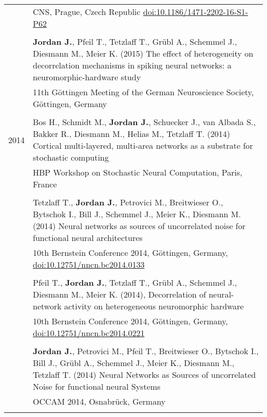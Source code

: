 \begin{longtable}{>{\hfill}p{1.6cm} p{}}
  & \footnotesize CNS, Prague, Czech Republic \href{http://dx.doi.org/10.1186/1471-2202-16-S1-P62}{doi:10.1186/1471-2202-16-S1-P62} \\
 \multicolumn{2}{c}{} \\
  & \textbf{Jordan J.}, Pfeil T., Tetzlaff T., Gr\"ubl A., Schemmel J., Diesmann M., Meier K. (2015) The effect of heterogeneity on decorrelation mechanisms in spiking neural networks: a neuromorphic-hardware study \\
  & \footnotesize 11th G\"ottingen Meeting of the German Neuroscience Society, G\"ottingen, Germany \\
  \multicolumn{2}{c}{} \\
  2014 & Bos H., Schmidt M., \textbf{Jordan J.}, Schuecker J., van Albada S., Bakker R., Diesmann M., Helias M., Tetzlaff T. (2014) Cortical multi-layered, multi-area networks as a substrate for stochastic computing \\
  & \footnotesize HBP Workshop on Stochastic Neural Computation, Paris, France \\
  \multicolumn{2}{c}{} \\
  &  Tetzlaff T., \textbf{Jordan J.}, Petrovici M., Breitwieser O., Bytschok I., Bill J., Schemmel J., Meier K., Diesmann M. (2014) Neural networks as sources of uncorrelated noise for functional neural architectures \\
  & \footnotesize 10th Bernstein Conference 2014, G\"ottingen, Germany, \href{http://dx.doi.org/10.12751/nncn.bc2014.0133}{doi:10.12751/nncn.bc2014.0133} \\
  \multicolumn{2}{c}{} \\
  & Pfeil T., \textbf{Jordan J.}, Tetzlaff T., Gr\"ubl A., Schemmel J., Diesmann M., Meier K. (2014), Decorrelation of neural-network activity on heterogeneous neuromorphic hardware \\
  & \footnotesize 10th Bernstein Conference 2014, G\"ottingen, Germany, \href{http://dx.doi.org/10.12751/nncn.bc2014.0221}{doi:10.12751/nncn.bc2014.0221} \\
  \multicolumn{2}{c}{} \\
  & \textbf{Jordan J.}, Petrovici M., Pfeil T., Breitwieser O., Bytschok I., Bill J., Gr\"ubl A., Schemmel J., Meier K., Diesmann M., Tetzlaff T. (2014) Neural Networks as Sources of uncorrelated Noise for functional neural Systems \\
  & \footnotesize OCCAM 2014, Osnabr\"uck, Germany \\
  \multicolumn{2}{c}{} \\

\end{longtable}
